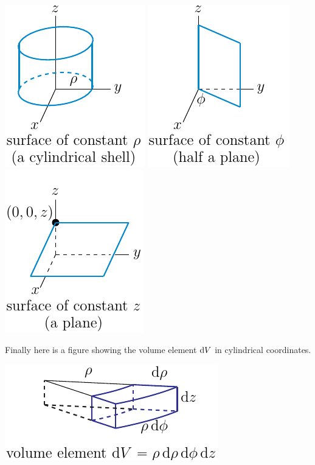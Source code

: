 \begin{wfig}
\begin{center}
    \includegraphics{cyl3.pdf}\qquad
    \includegraphics{cyl4.pdf}\qquad
    \includegraphics{cyl2.pdf}
\end{center}
\end{wfig}
Finally here is a figure showing the volume element $\mathrm{d}V$ in
cylindrical coordinates.
\begin{efig}
\begin{center}
    \includegraphics{cyl5.pdf}
\end{center}
\end{efig}

